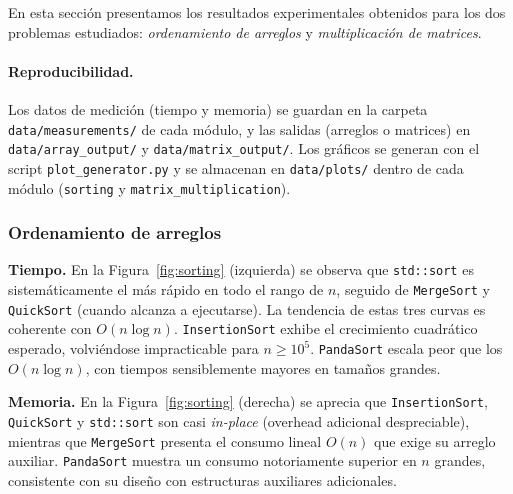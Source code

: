 En esta sección presentamos los resultados experimentales obtenidos para los dos problemas estudiados: \emph{ordenamiento de arreglos} y \emph{multiplicación de matrices}.

\paragraph{Reproducibilidad.}
Los datos de medición (tiempo y memoria) se guardan en la carpeta \texttt{data/measurements/} de cada módulo, y las salidas (arreglos o matrices) en \texttt{data/array\_output/} y \texttt{data/matrix\_output/}. 
Los gráficos se generan con el script \texttt{plot\_generator.py} y se almacenan en \texttt{data/plots/} dentro de cada módulo (\texttt{sorting} y \texttt{matrix\_multiplication}). %

\subsubsection*{Ordenamiento de arreglos}

\textbf{Tiempo.} En la Figura~\ref{fig:sorting} (izquierda) se observa que \texttt{std::sort} es sistemáticamente el más rápido en todo el rango de $n$, seguido de \texttt{MergeSort} y \texttt{QuickSort} (cuando alcanza a ejecutarse). La tendencia de estas tres curvas es coherente con $O(n\log n)$. \texttt{InsertionSort} exhibe el crecimiento cuadrático esperado, volviéndose impracticable para $n \ge 10^5$. \texttt{PandaSort} escala peor que los $O(n\log n)$, con tiempos sensiblemente mayores en tamaños grandes.

\textbf{Memoria.} En la Figura~\ref{fig:sorting} (derecha) se aprecia que \texttt{InsertionSort}, \texttt{QuickSort} y \texttt{std::sort} son casi \emph{in-place} (overhead adicional despreciable), mientras que \texttt{MergeSort} presenta el consumo lineal $O(n)$ que exige su arreglo auxiliar. \texttt{PandaSort} muestra un consumo notoriamente superior en $n$ grandes, consistente con su diseño con estructuras auxiliares adicionales.

